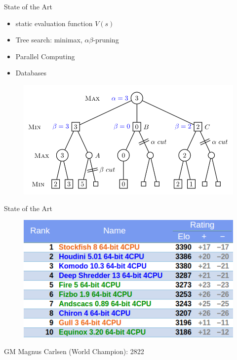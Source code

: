 \documentclass{beamer}
\begin{document}
\begin{frame}{State of the Art}
	\begin{itemize}
		\item static evaluation function $V(s)$
        \item Tree search: minimax, $\alpha\beta$-pruning
    	\item Parallel Computing
        \item Databases
	\end{itemize}
    \begin{figure}
		\includegraphics[scale=0.3]{abcutoff}
	\end{figure}
\end{frame}

\begin{frame}{State of the Art}
	\begin{figure}
		\includegraphics[scale=0.6]{sota_cc}
	\end{figure}
    GM Magnus Carlsen (World Champion): 2822
\end{frame}
\end{document}

